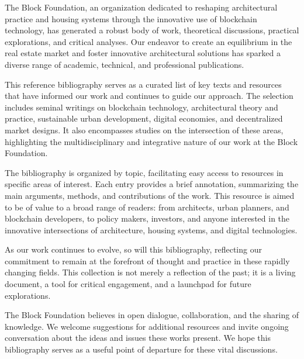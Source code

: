 The Block Foundation, an organization dedicated to reshaping architectural practice and housing systems through the innovative use of blockchain technology, has generated a robust body of work, theoretical discussions, practical explorations, and critical analyses. Our endeavor to create an equilibrium in the real estate market and foster innovative architectural solutions has sparked a diverse range of academic, technical, and professional publications.

This reference bibliography serves as a curated list of key texts and resources that have informed our work and continues to guide our approach. The selection includes seminal writings on blockchain technology, architectural theory and practice, sustainable urban development, digital economies, and decentralized market designs. It also encompasses studies on the intersection of these areas, highlighting the multidisciplinary and integrative nature of our work at the Block Foundation.

The bibliography is organized by topic, facilitating easy access to resources in specific areas of interest. Each entry provides a brief annotation, summarizing the main arguments, methods, and contributions of the work. This resource is aimed to be of value to a broad range of readers: from architects, urban planners, and blockchain developers, to policy makers, investors, and anyone interested in the innovative intersections of architecture, housing systems, and digital technologies.

As our work continues to evolve, so will this bibliography, reflecting our commitment to remain at the forefront of thought and practice in these rapidly changing fields. This collection is not merely a reflection of the past; it is a living document, a tool for critical engagement, and a launchpad for future explorations.

The Block Foundation believes in open dialogue, collaboration, and the sharing of knowledge. We welcome suggestions for additional resources and invite ongoing conversation about the ideas and issues these works present. We hope this bibliography serves as a useful point of departure for these vital discussions.